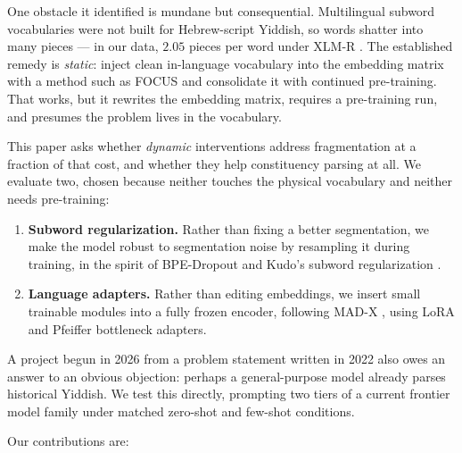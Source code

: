 \documentclass[11pt]{article}
\begin{document}
One obstacle it identified is mundane but consequential. Multilingual subword
vocabularies were not built for Hebrew-script Yiddish, so words shatter into many
pieces --- in our data, $2.05$ pieces per word under XLM-R
\citep{conneau-etal-2020-unsupervised}. The established remedy is \emph{static}:
inject clean in-language vocabulary into the embedding matrix with a method such
as FOCUS \citep{dobler-de-melo-2023-focus} and consolidate it with continued
pre-training. That works, but it rewrites the embedding matrix, requires a
pre-training run, and presumes the problem lives in the vocabulary.

This paper asks whether \emph{dynamic} interventions address fragmentation at a
fraction of that cost, and whether they help constituency parsing at all. We
evaluate two, chosen because neither touches the physical vocabulary and neither
needs pre-training:

\begin{enumerate}[itemsep=2pt,topsep=2pt]
\item \textbf{Subword regularization.} Rather than fixing a better segmentation,
we make the model robust to segmentation noise by resampling it during training,
in the spirit of BPE-Dropout \citep{provilkov-etal-2020-bpe} and Kudo's subword
regularization \citep{kudo-2018-subword}.
\item \textbf{Language adapters.} Rather than editing embeddings, we insert small
trainable modules into a fully frozen encoder, following MAD-X
\citep{pfeiffer-etal-2020-mad}, using LoRA \citep{hu-etal-2022-lora} and Pfeiffer
bottleneck adapters.
\end{enumerate}

A project begun in 2026 from a problem statement written in 2022 also owes an
answer to an obvious objection: perhaps a general-purpose model already parses
historical Yiddish. We test this directly, prompting two tiers of a current
frontier model family under matched zero-shot and few-shot conditions.

Our contributions are:
\end{document}
